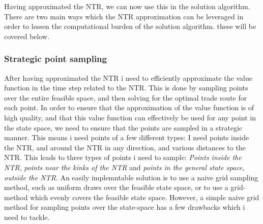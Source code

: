\documentclass[11pt]{article}
\begin{document}
Having approximated the \ac{NTR}, we can now use this in the solution algorithm. There are two main ways which the \ac{NTR} approximation can be leveraged in order to
lessen the computational burden of the solution algorithm. these will be covered below.
\subsubsection{Strategic point sampling} \label{Subsubsubsection: Sample}
After having approximated the \ac{NTR} i need to efficiently approximate the value function in the time step related to the \ac{NTR}. 
This is done by sampling points over the entire feasible space, and then solving for the optimal trade route for each point.
In order to ensure that the approximation of the value function is of high quality, and that this value function can effectively be used for any point in the state space,
we need to ensure that the points are sampled in a strategic manner. This means i need points of a few different types:
I need points inside the NTR, and around the \ac{NTR} in any direction, and various distances to the \ac{NTR}.
This leads to three types of points i need to sample: \textit{Points inside the \ac{NTR}}, \textit{points near the kinks of the \ac{NTR}} and \textit{points in the general state space, outside the \ac{NTR}}.
An easily implemntable solution is to use a naive grid sampling method, such as uniform draws over the feasible state space, or to use a grid-method which evenly covers the feasible state space. 
However, a simple naive grid method for sampling points over the state-space has a few drawbacks which i need to tackle.
\end{document}
